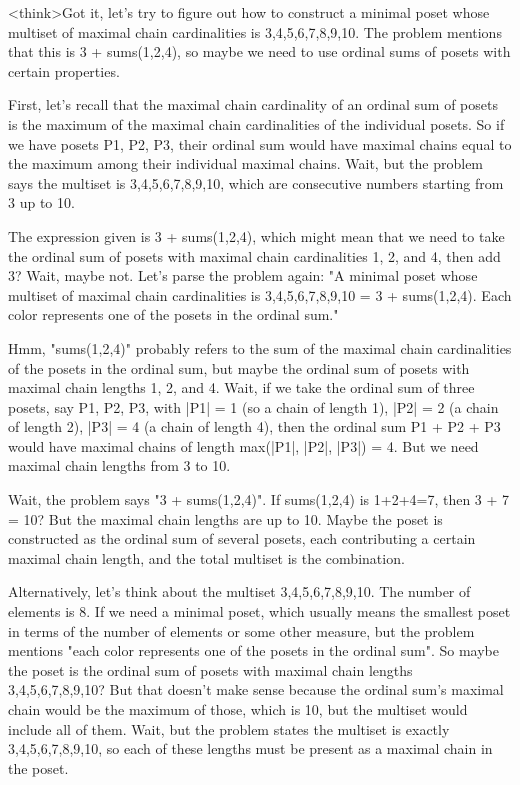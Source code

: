 <think>Got it, let's try to figure out how to construct a minimal poset whose multiset of maximal chain cardinalities is {3,4,5,6,7,8,9,10}. The problem mentions that this is 3 + sums({1,2,4}), so maybe we need to use ordinal sums of posets with certain properties. 

First, let's recall that the maximal chain cardinality of an ordinal sum of posets is the maximum of the maximal chain cardinalities of the individual posets. So if we have posets P1, P2, P3, their ordinal sum would have maximal chains equal to the maximum among their individual maximal chains. Wait, but the problem says the multiset is {3,4,5,6,7,8,9,10}, which are consecutive numbers starting from 3 up to 10. 

The expression given is 3 + sums({1,2,4}), which might mean that we need to take the ordinal sum of posets with maximal chain cardinalities 1, 2, and 4, then add 3? Wait, maybe not. Let's parse the problem again: "A minimal poset whose multiset of maximal chain cardinalities is {3,4,5,6,7,8,9,10} = 3 + sums({1,2,4}). Each color represents one of the posets in the ordinal sum." 

Hmm, "sums({1,2,4})" probably refers to the sum of the maximal chain cardinalities of the posets in the ordinal sum, but maybe the ordinal sum of posets with maximal chain lengths 1, 2, and 4. Wait, if we take the ordinal sum of three posets, say P1, P2, P3, with |P1| = 1 (so a chain of length 1), |P2| = 2 (a chain of length 2), |P3| = 4 (a chain of length 4), then the ordinal sum P1 + P2 + P3 would have maximal chains of length max(|P1|, |P2|, |P3|) = 4. But we need maximal chain lengths from 3 to 10. 

Wait, the problem says "3 + sums({1,2,4})". If sums({1,2,4}) is 1+2+4=7, then 3 + 7 = 10? But the maximal chain lengths are up to 10. Maybe the poset is constructed as the ordinal sum of several posets, each contributing a certain maximal chain length, and the total multiset is the combination. 

Alternatively, let's think about the multiset {3,4,5,6,7,8,9,10}. The number of elements is 8. If we need a minimal poset, which usually means the smallest poset in terms of the number of elements or some other measure, but the problem mentions "each color represents one of the posets in the ordinal sum". So maybe the poset is the ordinal sum of posets with maximal chain lengths 3,4,5,6,7,8,9,10? But that doesn't make sense because the ordinal sum's maximal chain would be the maximum of those, which is 10, but the multiset would include all of them. Wait, but the problem states the multiset is exactly {3,4,5,6,7,8,9,10}, so each of these lengths must be present as a maximal chain in the poset. 

